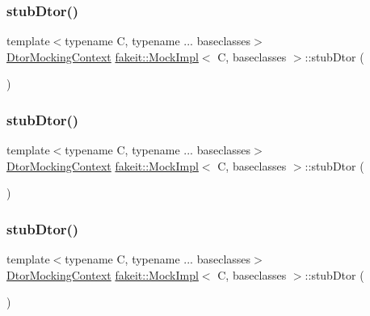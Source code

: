 \subsubsection{\texorpdfstring{stubDtor()}{stubDtor()}\hspace{0.1cm}{\footnotesize\ttfamily [4/9]}}
{\footnotesize\ttfamily template$<$typename C, typename ... baseclasses$>$ \\
\mbox{\hyperlink{classfakeit_1_1DtorMockingContext}{Dtor\+Mocking\+Context}} \mbox{\hyperlink{classfakeit_1_1MockImpl}{fakeit\+::\+Mock\+Impl}}$<$ C, baseclasses $>$\+::stub\+Dtor (\begin{DoxyParamCaption}{ }\end{DoxyParamCaption})\hspace{0.3cm}{\ttfamily [inline]}}

\mbox{\label{classfakeit_1_1MockImpl_ae64cb908c91a96faefbf0fabac948f29}} 
\subsubsection{\texorpdfstring{stubDtor()}{stubDtor()}\hspace{0.1cm}{\footnotesize\ttfamily [5/9]}}
{\footnotesize\ttfamily template$<$typename C, typename ... baseclasses$>$ \\
\mbox{\hyperlink{classfakeit_1_1DtorMockingContext}{Dtor\+Mocking\+Context}} \mbox{\hyperlink{classfakeit_1_1MockImpl}{fakeit\+::\+Mock\+Impl}}$<$ C, baseclasses $>$\+::stub\+Dtor (\begin{DoxyParamCaption}{ }\end{DoxyParamCaption})\hspace{0.3cm}{\ttfamily [inline]}}

\mbox{\label{classfakeit_1_1MockImpl_ae64cb908c91a96faefbf0fabac948f29}} 
\subsubsection{\texorpdfstring{stubDtor()}{stubDtor()}\hspace{0.1cm}{\footnotesize\ttfamily [6/9]}}
{\footnotesize\ttfamily template$<$typename C, typename ... baseclasses$>$ \\
\mbox{\hyperlink{classfakeit_1_1DtorMockingContext}{Dtor\+Mocking\+Context}} \mbox{\hyperlink{classfakeit_1_1MockImpl}{fakeit\+::\+Mock\+Impl}}$<$ C, baseclasses $>$\+::stub\+Dtor (\begin{DoxyParamCaption}{ }\end{DoxyParamCaption})\hspace{0.3cm}{\ttfamily [inline]}}


